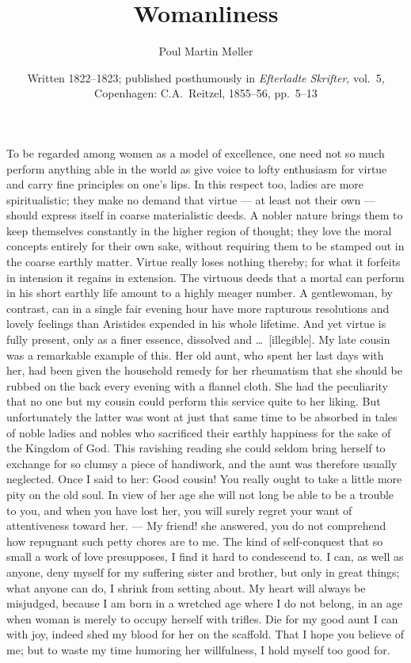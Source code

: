 \documentclass[12pt]{article}
\title{\textbf{Womanliness}}
\author{Poul Martin Møller}
\date{Written 1822--1823; published posthumously in \textit{Efterladte
  Skrifter}, vol.~5,\\ Copenhagen: C.A.\ Reitzel, 1855--56, pp.~5--13}
\newcommand{\opage}[1]{\marginnote{\footnotesize\textit{[#1]}}}
\begin{document}
\maketitle

\opage{5}To be regarded among women as a model of excellence, one need not so much
perform anything able in the world as give voice to lofty enthusiasm for virtue
and carry fine principles on one's lips. In this respect too, ladies are more
spiritualistic; they make no demand that virtue --- at least not their own ---
should express itself in coarse materialistic deeds. A nobler nature brings them
to keep themselves constantly in the higher region of thought; they love the
moral concepts entirely for their own sake, without requiring them to be stamped
out in the coarse earthly matter. Virtue really loses nothing thereby; for what it
forfeits in intension it regains in extension. The virtuous deeds that a mortal
can perform in his short earthly life amount to a highly meager number. A
gentlewoman, by contrast, can in a single fair evening hour have more rapturous
resolutions and lovely feelings than Aristides expended in his whole lifetime. And
yet virtue is fully present, only as a finer essence, dissolved and \ldots\
[illegible]. My late cousin was a remarkable example of this. Her old aunt, who
spent her last days with her, had been given the household remedy for her
rheumatism that she should be rubbed on the back every evening with a flannel
cloth. She had the peculiarity that no one but my cousin could perform this
service quite to her liking. But unfortunately the latter was wont at just that
same time to be absorbed in tales of noble ladies and nobles who sacrificed their
earthly happiness for the sake of the Kingdom of God. This ravishing reading
\opage{6}she could seldom bring herself to exchange for so clumsy a piece of
handiwork, and the aunt was therefore usually neglected. Once I said to her: Good
cousin! You really ought to take a little more pity on the old soul. In view of
her age she will not long be able to be a trouble to you, and when you have lost
her, you will surely regret your want of attentiveness toward her. --- My friend!
she answered, you do not comprehend how repugnant such petty chores are to me. The
kind of self-conquest that so small a work of love presupposes, I find it hard to
condescend to. I can, as well as anyone, deny myself for my suffering sister and
brother, but only in great things; what anyone can do, I shrink from setting
about. My heart will always be misjudged, because I am born in a wretched age
where I do not belong, in an age when woman is merely to occupy herself with
trifles. Die for my good aunt I can with joy, indeed shed my blood for her on the
scaffold. That I hope you believe of me; but to waste my time humoring her
willfulness, I hold myself too good for.
\end{document}
